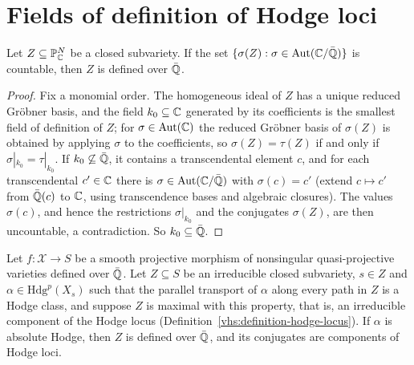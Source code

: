 \section{Fields of definition of Hodge loci}\label{absolute-hodge:section-hodge-loci}

\begin{lemma}\label{absolute-hodge:lemma-countable-conjugates}
Let $Z \subseteq \mathbb{P}^N_{\mathbb{C}}$ be a closed subvariety. If the set $\{\sigma(Z) : \sigma \in \mathrm{Aut}(\mathbb{C}/\bar{\mathbb{Q}})\}$ is countable, then $Z$ is defined over $\bar{\mathbb{Q}}$.
\end{lemma}

\begin{proof}
Fix a monomial order. The homogeneous ideal of $Z$ has a unique reduced Gr\"obner basis, and the field $k_0 \subseteq \mathbb{C}$ generated by its coefficients is the smallest field of definition of $Z$; for
$\sigma \in \mathrm{Aut}(\mathbb{C})$ the reduced Gr\"obner basis of $\sigma(Z)$ is obtained by applying $\sigma$ to the coefficients, so $\sigma(Z) = \tau(Z)$ if and only if $\sigma|_{k_0} = \tau|_{k_0}$. If $k_0 \not\subseteq \bar{\mathbb{Q}}$,
it contains a transcendental element $c$, and for each transcendental $c' \in \mathbb{C}$ there is $\sigma \in \mathrm{Aut}(\mathbb{C}/\bar{\mathbb{Q}})$ with $\sigma(c) = c'$ (extend $c \mapsto c'$ from $\bar{\mathbb{Q}}(c)$ to $\mathbb{C}$, using transcendence
bases and algebraic closures). The values $\sigma(c)$, and hence the restrictions $\sigma|_{k_0}$ and the conjugates $\sigma(Z)$, are then uncountable, a contradiction. So $k_0 \subseteq \bar{\mathbb{Q}}$.
\end{proof}

\begin{proposition}[Voisin]\label{absolute-hodge:proposition-voisin}
Let $f \colon \mathcal{X} \to S$ be a smooth projective morphism of nonsingular quasi-projective varieties defined over $\bar{\mathbb{Q}}$. Let $Z \subseteq S$ be an irreducible closed subvariety, $s \in Z$ and
$\alpha \in \mathrm{Hdg}^p(X_s)$ such that the parallel transport of $\alpha$ along every path in $Z$ is a Hodge class, and suppose $Z$ is maximal with this property, that is, an irreducible component of the Hodge
locus (Definition~\ref{vhs:definition-hodge-locus}). If $\alpha$ is absolute Hodge, then $Z$ is defined over $\bar{\mathbb{Q}}$, and its conjugates are components of Hodge loci.
\end{proposition}

